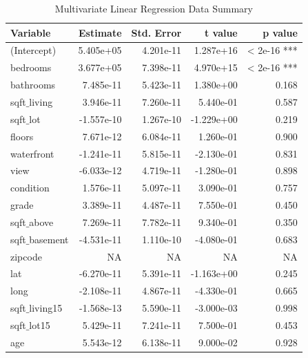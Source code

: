 \documentclass[a4paper, 9pt]{article}
\begin{document}
\begin{table}[ht]
\centering
\begin{tabular}{|l|r|r|r|r|}
\hline
\textbf{Variable} & \textbf{Estimate} & \textbf{Std. Error} & \textbf{t value} & \textbf{p value} \\
\hline
(Intercept)       & 5.405e+05   & 4.201e-11  & 1.287e+16  & < 2e-16 ***  \\
bedrooms          & 3.677e+05   & 7.398e-11  & 4.970e+15  & < 2e-16 ***  \\
bathrooms         & 7.485e-11   & 5.423e-11  & 1.380e+00  & 0.168        \\
sqft$\_$living       & 3.946e-11   & 7.260e-11  & 5.440e-01  & 0.587        \\
sqft$\_$lot          & -1.557e-10  & 1.267e-10  & -1.229e+00 & 0.219        \\
floors            & 7.671e-12   & 6.084e-11  & 1.260e-01  & 0.900        \\
waterfront        & -1.241e-11  & 5.815e-11  & -2.130e-01 & 0.831        \\
view              & -6.033e-12  & 4.719e-11  & -1.280e-01 & 0.898        \\
condition         & 1.576e-11   & 5.097e-11  & 3.090e-01  & 0.757        \\
grade             & 3.389e-11   & 4.487e-11  & 7.550e-01  & 0.450        \\
sqft$\_$above        & 7.269e-11   & 7.782e-11  & 9.340e-01  & 0.350        \\
sqft$\_$basement     & -4.531e-11  & 1.110e-10  & -4.080e-01 & 0.683        \\
zipcode           & NA          & NA         & NA         & NA           \\
lat               & -6.270e-11  & 5.391e-11  & -1.163e+00 & 0.245        \\
long              & -2.108e-11  & 4.867e-11  & -4.330e-01 & 0.665        \\
sqft$\_$living15     & -1.568e-13  & 5.590e-11  & -3.000e-03 & 0.998        \\
sqft$\_$lot15        & 5.429e-11   & 7.241e-11  & 7.500e-01  & 0.453        \\
age               & 5.543e-12   & 6.138e-11  & 9.000e-02  & 0.928        \\
\hline
\end{tabular}
\caption{Multivariate Linear Regression Data Summary}
\label{mlrcoeffs}
\end{table}
\end{document}
